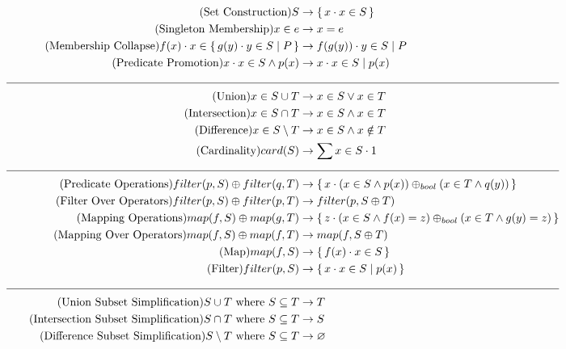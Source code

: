 \documentclass{article}
\newcommand{\bSet}[3]{%
  \{\, #1 \cdot #2 \mid #3 \, \}%
}
\newcommand{\bSetT}[2]{%
  \{\, #1 \cdot #2 \,\}%
}
\begin{document}
\begin{align}
  \tag{Set Construction}
  S &\rightarrow \bSetT{x}{x \in S}
  \\
  \tag{Singleton Membership}
  x \in {e} &\rightarrow x = e
  \\
  \tag{Membership Collapse}
  f(x) \cdot x \in \bSet{g(y)}{y \in S}{P} &\rightarrow f(g(y)) \cdot y \in S \mid P
  \\
  \tag{Predicate Promotion}
  x \cdot x \in S \land p(x) &\rightarrow x \cdot x \in S \mid p(x)
  \\
  \cline{1-2}
  \tag{Union}
  x \in S \cup T &\rightarrow x \in S \lor x \in T
  \\
  \tag{Intersection}
  x \in S \cap T &\rightarrow x \in S \land x \in T
  \\
  \tag{Difference}
  x \in S \setminus T &\rightarrow x \in S \land x \notin T
  \\
  \tag{Cardinality}
  card(S) &\rightarrow \sum x \in S \cdot 1
  \\
  \cline{1-2}
  \tag{Predicate Operations}
  filter(p, S) \oplus filter(q, T) &\rightarrow \bSetT{x}{(x \in S \land p(x)) \oplus_{bool} (x \in T \land q(y))}
  \\
  \tag{Filter Over Operators}
  filter(p, S) \oplus filter(p, T) &\rightarrow filter(p, S \oplus T)
  \\
  \tag{Mapping Operations}
  map(f, S) \oplus map(g, T) &\rightarrow \bSetT{z}{(x \in S \land f(x) = z) \oplus_{bool} (x \in T \land g(y) = z)}
  \\
  \tag{Mapping Over Operators}
  map(f, S) \oplus map(f, T) &\rightarrow map(f, S \oplus T)
  \\
  \tag{Map}
  map(f, S)  &\rightarrow \bSetT{f(x)}{x \in S}
  \\
  \tag{Filter}
  filter(p, S)  &\rightarrow \bSet{x}{x \in S}{p(x)}
  \\
  \cline{1-2}
  \tag{Union Subset Simplification}
  S \cup T \text{ where } S \subseteq T &\rightarrow T
  \\
  \tag{Intersection Subset Simplification}
  S \cap T \text{ where } S \subseteq T &\rightarrow S
  \\
  \tag{Difference Subset Simplification}
  S \setminus T \text{ where } S \subseteq T &\rightarrow \emptyset

\end{align}
\end{document}
